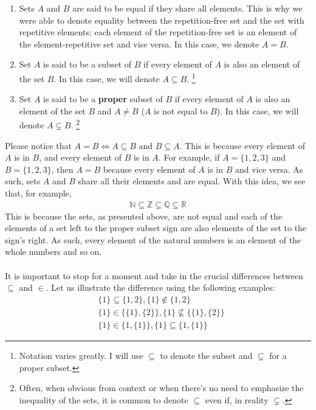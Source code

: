 \documentclass{tufte-handout} %
\theoremstyle{definition}
\theoremstyle{remark}
\begin{document}
\begin{enumerate}
    \item Sets $A$ and $B$ are said to be equal if they share all elements. This is why we were able to denote equality between the repetition-free set and the set with repetitive elements: each element of the repetition-free set is an element of the element-repetitive set and vise versa. In this case, we denote $A=B$. 
    \item Set $A$ is said to be a subset of $B$ if every element of $A$ is also an element of the set $B$. In this case, we will denote $A \subseteq B$. \footnote{Notation varies greatly. I will use $\subseteq$ to denote the subset and $\subsetneq$ for a proper subset.}
    \item Set $A$ is said to be a \textbf{proper} subset of $B$ if every element of $A$ is also an element of the set $B$ and $A \neq B$ ($A$ is not equal to $B$). In this case, we will denote $A \subsetneq B$. \footnote{Often, when obvious from context or when there's no need to emphasize the inequality of the sets, it is common to denote $\subseteq$ even if, in reality $\subsetneq$.}
\end{enumerate}
Please notice that \( A = B \Longleftrightarrow A \subseteq B \text{ and } B \subseteq A \). This is because every element of \( A \) is in \( B \), and every element of \( B \) is in \( A \). For example, if \( A = \{1, 2, 3\} \) and \( B = \{1, 2, 3\} \), then \( A = B \) because every element of \( A \) is in \( B \) and vice versa. As such, sets \( A \) and \( B \) share all their elements and are equal. With this idea, we see that, for example, 
\begin{align*}
    \mathbb{N} \subseteq \mathbb{Z} \subseteq \mathbb{Q} \subseteq \mathbb{R} 
\end{align*}
This is because the sets, as presented above, are not equal and each of the elements of a set left to the proper subset sign are also elements of the set to the sign's right. As such, every element of the natural numbers is an element of the whole numbers and so on.
\\\\
It is important to stop for a moment and take in the crucial differences between $\subseteq$ and $\in$. Let us illustrate the difference using the following examples:
\begin{align*}
    &\{1\} \subseteq \{1,2\}, \{1\} \not\in \{1,2\} \\
    &\{1\} \in \{\{1\},\{2\}\}, \{1\} \not\subseteq \{\{1\},\{2\}\}\\
    &\{1\}\in \{1,\{1\}\}, \{1\}\subseteq \{1,\{1\}\}
\end{align*}
\end{document}
